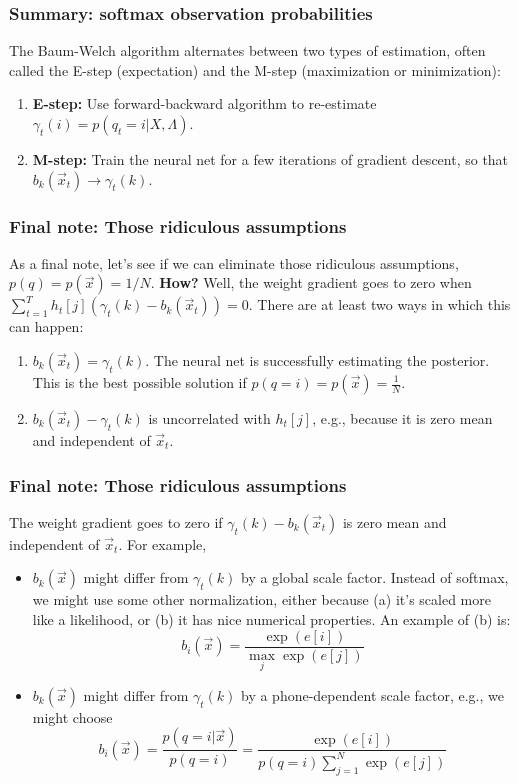 \documentclass{beamer}
\begin{document}
\begin{frame}
  \frametitle{Summary: softmax observation probabilities}

  The Baum-Welch algorithm alternates between two types of estimation,
  often called the E-step (expectation) and the M-step (maximization
  or minimization):
  \begin{enumerate}
  \item {\bf E-step:} Use forward-backward algorithm to re-estimate
    $\gamma_t(i)=p(q_t=i|X,\Lambda)$.
  \item {\bf M-step:} Train the neural net for a few iterations of
    gradient descent, so that $b_k(\vec{x}_t)\rightarrow \gamma_t(k)$.
  \end{enumerate}
\end{frame}

\begin{frame}
  \frametitle{Final note: Those ridiculous assumptions}

  As a final note, let's see if we can eliminate those ridiculous
  assumptions, $p(q)=p(\vec{x})=1/N$.  {\bf How?}  Well, the weight
  gradient goes to zero when $\sum_{t=1}^T
  h_{t}[j]\left(\gamma_t(k)-b_k(\vec{x}_t)\right)=0$.  There are at
  least two ways in which this can happen:
  \begin{enumerate}
  \item $b_k(\vec{x}_t)=\gamma_t(k)$.  The neural net is successfully
    estimating the posterior.  This is the best possible solution if
    $p(q=i)=p(\vec{x})=\frac{1}{N}$.
  \item $b_k(\vec{x}_t)-\gamma_t(k)$ is uncorrelated with $h_t[j]$,
    e.g., because it is zero mean and independent of $\vec{x}_t$.
  \end{enumerate}
\end{frame}

\begin{frame}
  \frametitle{Final note: Those ridiculous assumptions}

  The weight gradient goes to zero if $\gamma_t(k)-b_k(\vec{x}_t)$ is
  zero mean and independent of $\vec{x}_t$.  For example,
  \begin{itemize}
  \item $b_k(\vec{x})$ might differ from $\gamma_t(k)$ by a global
    scale factor.  Instead of softmax, we might use some other
    normalization, either because (a) it's scaled more like a
    likelihood, or (b) it has nice numerical properties.  An example
    of (b) is:
    \[
    b_i(\vec{x}) = \frac{\exp(e[i])}{\max_j \exp(e[j])}
    \]
  \item $b_k(\vec{x})$ might differ from $\gamma_t(k)$ by a
    phone-dependent scale factor, e.g., we might choose
    \[
    b_i(\vec{x}) =\frac{p(q=i|\vec{x})}{p(q=i)}=
    \frac{\exp(e[i])}{p(q=i)\sum_{j=1}^N\exp(e[j])}
    \]
  \end{itemize}
\end{frame}
\end{document}
